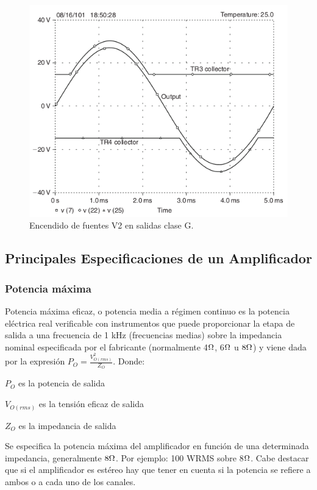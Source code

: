 \begin{figure}[H]
 \centering
 \includegraphics[scale=0.55]{img/ampliG_salida.png}
 \caption{Encendido de fuentes V2 en salidas clase G.}
 \label{ampliG_salida} 
 \end{figure}

\subsection{Principales Especificaciones de un Amplificador}
\medskip 
\subsubsection*{Potencia máxima}

Potencia máxima eficaz, o potencia media a régimen continuo es la potencia eléctrica real verificable con instrumentos que puede proporcionar la etapa de salida  a una frecuencia de 1 kHz (frecuencias medias) sobre la impedancia nominal especificada por el fabricante (normalmente 4$\ohm$, 6$\ohm$ u $8\ohm$) y viene dada por la expresión $P_O=  \frac{V_{O(rms)}^2}{Z_O}$. Donde:
\begin{description}
\item $P_O$ es la potencia de salida
\item $V_{O(rms)}$ es la tensión eficaz de salida
\item $Z_O$ es la impedancia de salida
\end{description}

Se especifica la potencia máxima del amplificador en función de una determinada impedancia, generalmente $8\ohm$. Por ejemplo: 100 WRMS sobre 8$\ohm$.
Cabe destacar que si el amplificador es estéreo hay que tener en cuenta si la potencia se refiere a      ambos o a cada uno de los canales.
\medskip 
